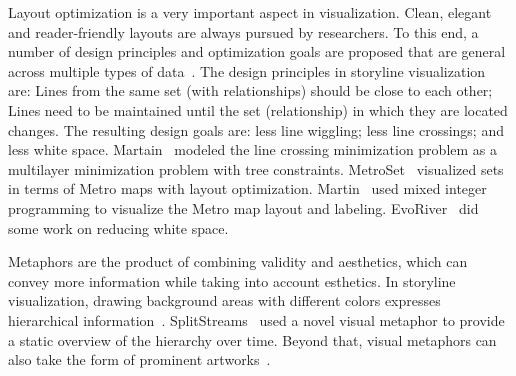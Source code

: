 Layout optimization is a very important aspect in visualization. Clean, elegant and reader-friendly layouts are always pursued by researchers. To this end, a number of design principles and optimization goals are proposed that are general across multiple types of data~\cite{tanahashi_design_2012, liu_storyflow_2013, tanahashi_efficient_2015}. The design principles in storyline visualization are:  Lines from the same set (with relationships) should be close to each other;  Lines need to be maintained until the set (relationship) in which they are located changes. The resulting design goals are:  less line wiggling;  less line crossings; and  less white space. Martain~\cite{gronemann_crossing_2016} modeled the line crossing minimization problem as a multilayer minimization problem with tree constraints. MetroSet~\cite{jacobsen_metrosets_2020} visualized sets in terms of Metro maps with layout optimization. Martin~\cite{nollenburg_drawing_2010} used mixed integer programming to visualize the Metro map layout and labeling. EvoRiver~\cite{sun_evoriver_2014} did some work on reducing white space.

Metaphors are the product of combining validity and aesthetics, which can convey more information while taking into account esthetics. In storyline visualization, drawing background areas with different colors expresses hierarchical information~\cite{liu_storyflow_2013, jacobsen_metrosets_2020, reda_visualizing_2011}. SplitStreams~\cite{bolte_splitstreams_2020} used a novel visual metaphor to provide a static overview of the hierarchy over time. Beyond that, visual metaphors can also take the form of prominent artworks~\cite{zhang_visual_2022}.
